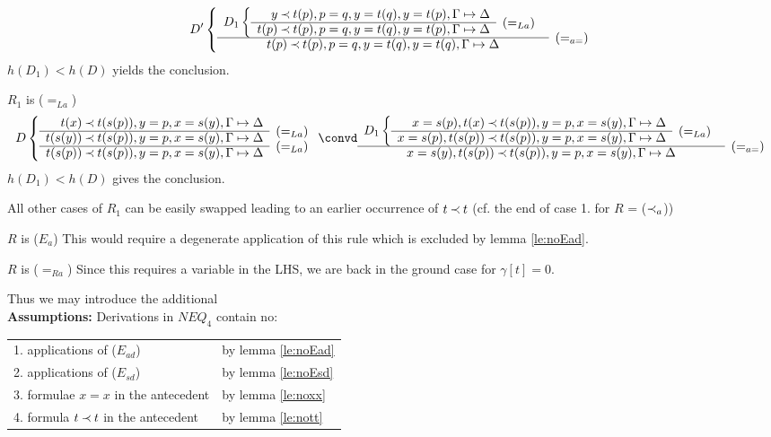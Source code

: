 \begin{PROOF}
\begin{LS}
\begin{LSA}
\[%
 D' \left \{ \begin{array}{cl}
  D_1 \left \{ \begin{array}{rl}
 y\Incl t(p), p=q, y=t(q), y=t(p), \GSD \\ \cline{1-1}
t(p)\Incl t(p), p=q, y=t(q), y=t(p), \GSD & \rabove{(=_{La})} 
\end{array} \right . \\ \cline{1-1}
t(p)\Incl t(p), p=q, y=t(q), y=t(q), \GSD & \rabove{(=_{a=})} 
\end{array} \right . \]
 $h(D_1)<h(D)$ yields the conclusion.
%
\item $R_1$ is ($=_{La}$) 
\[ D \left \{ \begin{array}{rl}
 t(x)\Incl t(s(p)), y=p, x=s(y), \GSD \\ \cline{1-1}
 t(s(y))\Incl t(s(p)), y=p, x=s(y), \GSD & \rabove{(=_{La})} \\ \cline{1-1}
 t(s(p))\Incl t(s(p)), y=p, x=s(y), \GSD & \rabove{(=_{La})} \end{array}
 \right . \convd
 \begin{array}{cl} D_1 \left \{ \begin{array}{rl}
 x=s(p), t(x)\Incl t(s(p)), y=p, x=s(y), \GSD \\ \cline{1-1} 
 x=s(p), t(s(p))\Incl t(s(p)), y=p, x=s(y), \GSD & \rabove{(=_{La})} 
\end{array} \right .  \\ \cline{1-1}
 x=s(y), t(s(p))\Incl t(s(p)), y=p, x=s(y), \GSD & \rabove{(=_{a=})} 
\end{array} \]
 $h(D_1)<h(D)$ gives the conclusion.
%
\item All other cases of $R_1$ can be easily swapped leading to an earlier
occurrence of $t\mathbin{\prec} t$ (cf. the end of case 1. for $R$ = ($\mathbin{\prec}_a$))
%
\end{LSA}
%
\item  $R$ is ($E_a$) This would require a degenerate application of this
rule which is excluded by lemma \ref{le:noEad}. 
%
\item  $R$ is ($=_{Ra}$) Since this requires a variable in the LHS, we are
back in the ground case for $\gamma[t]=0$.
\end{LS}
\end{PROOF}
%
\noindent
Thus we may introduce the additional
\\[1ex]
\noindent
{\bf Assumptions:} Derivations in $NEQ_4$ contain no:

\begin{tabular}{ll}
1. applications of ($E_{ad}$) & by lemma \ref{le:noEad} \\
2. applications of ($E_{sd}$) & by lemma \ref{le:noEsd} \\
3. formulae $x=x$ in the antecedent & by lemma \ref{le:noxx} \\
4. formula $t\mathbin{\prec} t$ in the antecedent & by lemma \ref{le:nott} 
\end{tabular} 

